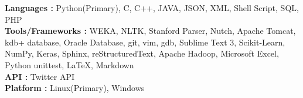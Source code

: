 

\textbf{Languages :}  Python(Primary), C, C++, JAVA, JSON, XML, Shell Script, SQL, PHP \\
\textbf{Tools/Frameworks :} WEKA, NLTK, Stanford Parser, Nutch, Apache Tomcat, kdb+ database, Oracle Database, git, vim, gdb, Sublime Text 3, Scikit-Learn, NumPy, Keras, Sphinx, reStructuredText, Apache Hadoop,
Microsoft Excel, Python unittest, \LaTeX, Markdown\\
\textbf{API :} Twitter API \\
\textbf{Platform :} Linux(Primary), Windows